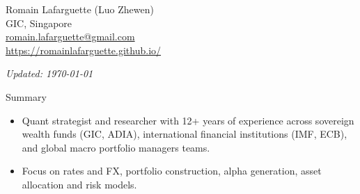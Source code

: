 \documentclass[usegeometry, 10pt, a4paper]{cv} %
\begin{document}
\hspace{10mm}
\begin{chapeau}
\begin{adresse}
\begin{flushleft}
    Romain Lafarguette (Luo Zhewen)\\
    GIC, Singapore \\
    \href{mailto:romain.lafarguette@gmail.com}{romain.lafarguette@gmail.com}\\
    \url{https://romainlafarguette.github.io/} \\
\end{flushleft}
\end{adresse}
\begin{etatcivil}
\begin{flushleft}
  \hspace{15mm} \emph{Updated: \monthyeardate\today}\\
\end{flushleft}
\end{etatcivil}
\end{chapeau}

\begin{rubriquetableau}[0.95\textwidth]{Summary}\\
  \vspace{-1cm}
  \begin{itemize}
    \item Quant strategist and researcher with 12+ years of experience across sovereign wealth funds (GIC, ADIA), international financial institutions (IMF, ECB), and global macro portfolio managers teams.
    \item Focus on rates and FX, portfolio construction, alpha generation, asset allocation and risk models.
  \end{itemize}

\end{rubriquetableau}

\vspace{0.2cm}

\end{document}
